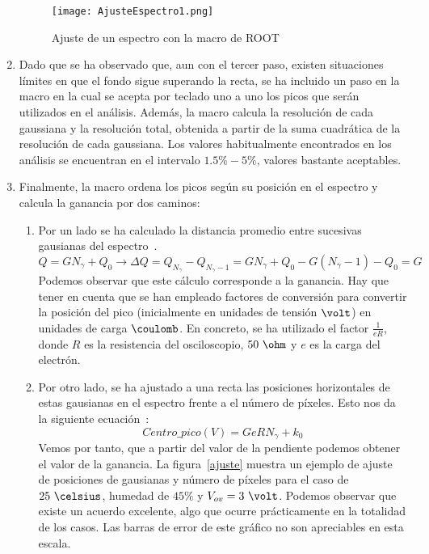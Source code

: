 \begin{enumerate}
\begin{figure}[hbtp]
\centering
\texttt{[image: AjusteEspectro1.png]}
\caption{ Ajuste de un espectro con la macro de ROOT\label{Root}}
\end{figure}

\item {} Dado que se ha observado que, aun con el tercer paso, existen situaciones límites en que el fondo sigue superando la recta, se ha incluido un paso en la macro en la cual se acepta por teclado uno a uno los picos que serán utilizados en el análisis. Además, la macro calcula la resolución de cada gaussiana y la resolución total, obtenida a partir de la suma cuadrática de la resolución de cada gaussiana. Los valores habitualmente encontrados en los análisis se encuentran en el intervalo $1.5\% - 5\%$, valores bastante aceptables.

\item {} Finalmente, la macro ordena los picos según su posición en el espectro y calcula la ganancia por dos caminos:
	\begin{enumerate}

	\item {} Por un lado se ha calculado la distancia promedio entre sucesivas gausianas del espectro~\cite{Hueso}.
	\begin{equation} 
	Q = G N_\gamma + Q_0 \longrightarrow \Delta Q= Q_{N_\gamma} - Q_{N_\gamma -1}=G N_\gamma+ Q_0 - G(N_		\gamma -1) - Q_0 = G
	\label{gananciametodo1}
	\end{equation}
	Podemos observar que este cálculo corresponde a la ganancia. Hay que tener en cuenta que se han empleado factores de conversión para convertir la posición del pico (inicialmente en unidades de	tensión $\volt$) en unidades de carga $\coulomb$. En concreto, se ha utilizado el factor $\frac{1}{eR}$, donde $R$ es la resistencia del osciloscopio, $50~\ohm$ y $e$ es la carga del electrón.
	
	\item {} Por otro lado, se ha ajustado a una recta las posiciones horizontales de estas gausianas en el 	espectro frente a el número de píxeles. Esto nos da la siguiente ecuación~\cite{Hueso}:
	\begin{equation}
	Centro\_pico(V) = GeRN_\gamma + k_0
	\label{gananciametodo2}
	\end{equation}
	 Vemos por tanto, que a partir del valor de la pendiente podemos obtener	el valor de la ganancia. La figura~\ref{ajuste} muestra un ejemplo de ajuste de posiciones de gausianas y número de píxeles para el caso de $25~\celsius$, humedad de $45\%$ y $V_{ov}=3~\volt$. Podemos observar que existe	un acuerdo excelente, algo que ocurre prácticamente en la totalidad de los casos. Las barras de error  de este gráfico  no son apreciables en esta  escala.
		

\end{enumerate}
\end{enumerate}
